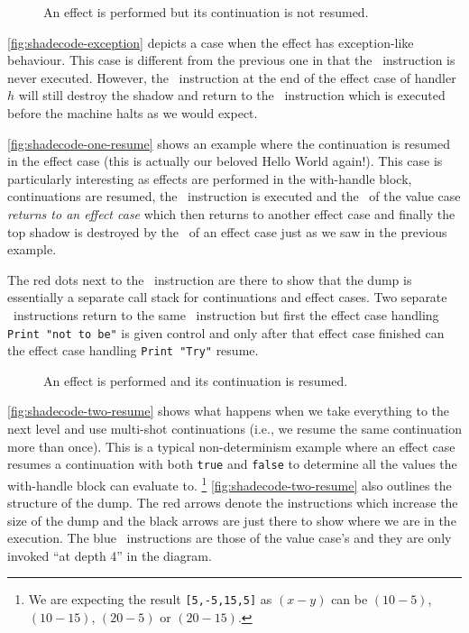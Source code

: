 \documentclass[class=article, crop=false]{standalone}
\begin{document}
\begin{figure}
    \centering
    \caption{An effect is performed but its continuation is not resumed.}
    \label{fig:shadecode-exception}
\end{figure}

\autoref{fig:shadecode-exception} depicts a case when the effect has exception-like
behaviour. This case is different from the previous one in that the \vmKillShadow\ instruction
is never executed. However, the \vmRett\ instruction at the end of the effect case of handler
$h$ will still destroy the shadow and return to the \vmFin\ instruction which is
executed before the machine halts as we would expect.

\autoref{fig:shadecode-one-resume} shows an example where the continuation is resumed
in the effect case (this is actually our beloved Hello World again!). This case is particularly
interesting as effects are performed in the with-handle block, continuations are resumed,
the \vmKillShadow\ instruction is executed and the \vmRett\ of the value case
\emph{returns to an effect case} which then returns to another effect case and
finally the top shadow is destroyed by the \vmRett\ of an effect case just as we
saw in the previous example.

The red dots next to the \vmApply\ instruction are there to show that the dump
is essentially a separate call stack for continuations and effect cases.
Two separate \vmRett\ instructions return to the same \vmApply\ instruction
but first the effect case handling \lstinline{Print "not to be"} is given
control and only after that effect case finished can the effect case handling
\lstinline{Print "Try"} resume.

\begin{figure}
    \centering
    \caption{An effect is performed and its continuation is resumed.}
    \label{fig:shadecode-one-resume}
\end{figure}
 
\autoref{fig:shadecode-two-resume} shows what happens when we take everything to
the next level and use multi-shot continuations (i.e., we resume the same continuation
more than once). This is a typical non-determinism example where an effect case resumes
a continuation with both \lstinline{true} and \lstinline{false} to determine all the
values the with-handle block can evaluate to.
\footnote{We are expecting the result \lstinline{[5,-5,15,5]} as $(x-y)$ can be $(10-5)$, $(10-15)$,
$(20-5)$ or $(20-15)$.}
\autoref{fig:shadecode-two-resume} also outlines the structure of the dump.
The red arrows denote the instructions which increase the size of the dump and
the black arrows are just there to show where we are in the execution.
The blue \vmRett\ instructions are those of the value case's and they are only invoked
``at depth 4'' in the diagram.
\end{document}
